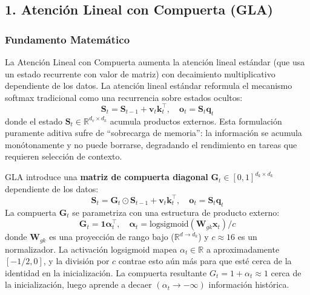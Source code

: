 \subsection{1. Atención Lineal con Compuerta (GLA)}

\subsubsection{Fundamento Matemático}

La Atención Lineal con Compuerta \citep{yang_gla_2023} aumenta la atención lineal estándar (que usa un estado recurrente con valor de matriz) con decaimiento multiplicativo dependiente de los datos. La atención lineal estándar reformula el mecanismo softmax tradicional como una recurrencia sobre estados ocultos:
\[
\mathbf{S}_t = \mathbf{S}_{t-1} + \mathbf{v}_t \mathbf{k}_t^\top, \quad \mathbf{o}_t = \mathbf{S}_t \mathbf{q}_t
\]
donde el estado $\mathbf{S}_t \in \mathbb{R}^{d_v \times d_k}$ acumula productos externos. Esta formulación puramente aditiva sufre de ``sobrecarga de memoria'': la información se acumula monótonamente y no puede borrarse, degradando el rendimiento en tareas que requieren selección de contexto.

GLA introduce una \textbf{matriz de compuerta diagonal} $\mathbf{G}_t \in [0,1]^{d_k \times d_k}$ dependiente de los datos:
\[
\mathbf{S}_t = \mathbf{G}_t \odot \mathbf{S}_{t-1} + \mathbf{v}_t \mathbf{k}_t^\top, \quad \mathbf{o}_t = \mathbf{S}_t \mathbf{q}_t
\]
La compuerta $\mathbf{G}_t$ se parametriza con una estructura de producto externo:
\[
\mathbf{G}_t = \mathbf{1} \boldsymbol{\alpha}_t^\top, \quad \boldsymbol{\alpha}_t = \text{logsigmoid}\left(\mathbf{W}_{gk} \mathbf{x}_t\right) / c
\]
donde $\mathbf{W}_{gk}$ es una proyección de rango bajo ($\mathbb{R}^{d \to d_k}$) y $c \approx 16$ es un normalizador. La activación logsigmoid mapea $\alpha_t \in \mathbb{R}$ a aproximadamente $[-1/2, 0]$, y la división por $c$ contrae esto aún más para que esté cerca de la identidad en la inicialización. La compuerta resultante $G_t = 1 + \alpha_t \approx 1$ cerca de la inicialización, luego aprende a decaer $(\alpha_t \to -\infty)$ información histórica.

